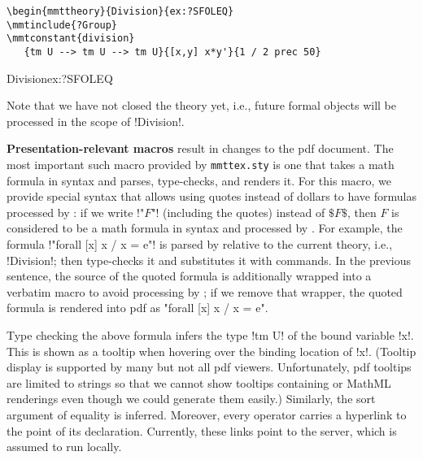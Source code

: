 \begin{lstlisting}
\begin{mmttheory}{Division}{ex:?SFOLEQ}
\mmtinclude{?Group}
\mmtconstant{division}
   {tm U --> tm U --> tm U}{[x,y] x*y'}{1 / 2 prec 50}
\end{lstlisting}

\begin{mmttheory}{Division}{ex:?SFOLEQ}

\noindent
Note that we have not closed the theory yet, i.e., future formal objects will be processed in the scope of !Division!.
\medskip

\textbf{Presentation-relevant macros} result in changes to the pdf document.
The most important such macro provided by \texttt{mmttex.sty} is one that takes a math formula in \mmt syntax and parses, type-checks, and renders it.
For this macro, we provide special syntax that allows using quotes instead of dollars to have formulas processed by \mmt:
if we write !"$F$"! (including the quotes) instead of $\mathdollar F\mathdollar$, then $F$ is considered to be a math formula in \mmt syntax and processed by \mmt.
For example, the formula !"forall [x] x / x = e"! is parsed by \mmt relative to the current theory, i.e., !Division!; then \mmt type-checks it and substitutes it with \latex commands. In the previous sentence, the \latex source of the quoted formula is additionally wrapped into a verbatim macro to avoid processing by \mmt; if we remove that wrapper, the quoted formula is rendered into pdf as "forall [x] x / x = e".

Type checking the above formula infers the type !tm U! of the bound variable !x!.
This is shown as a tooltip when hovering over the binding location of !x!.
(Tooltip display is supported by many but not all pdf viewers.
Unfortunately, pdf tooltips  are limited to strings so that we cannot show tooltips containing \latex or MathML renderings even though we could generate them easily.)
Similarly, the sort argument of equality is inferred.
Moreover, every operator carries a hyperlink to the point of its declaration.
Currently, these links point to the \mmt server, which is assumed to run locally.
\medskip


\end{mmttheory}
